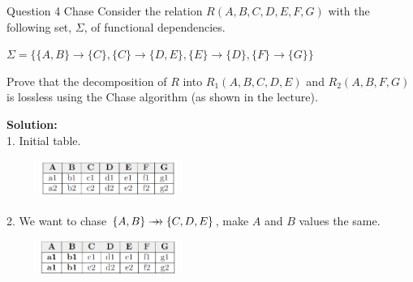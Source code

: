 \begin{frame}[fragile]{Question 4 Chase}
	Consider the relation $R(A,B,C,D,E,F,G)$ with the following set, $\Sigma$, of functional dependencies.\\ \vspace{5pt}
	
	$\Sigma=\{\{A,B\}\rightarrow\{C\},\{C\}\rightarrow\{D,E\},\{E\}\rightarrow\{D\},\{F\}\rightarrow\{G\}\}$\\ \vspace{5pt}
	
	Prove that the decomposition of $R$ into $R_1(A,B,C,D,E)$ and $R_2(A,B,F,G)$ is lossless using the Chase algorithm (as shown in the lecture).\\ \vspace{5pt}
	
	\textbf{Solution:}\\ \vspace{2pt}
	1. Initial table.\\
	\begin{figure}
		\includegraphics[width=0.4\textwidth, trim=0 0 0 0, clip]{4221-t5/images/4-1.png}
	\end{figure}
	
	2. We want to chase $\{A,B\} \mbox{$\; \rightarrow \! \! \! \! \rightarrow \; $} \{C,D,E\}$, make $A$ and $B$ values the same.\\
	\begin{figure}
		\includegraphics[width=0.4\textwidth, trim=0 0 0 0, clip]{4221-t5/images/4-2.png}
	\end{figure}	
\end{frame}

